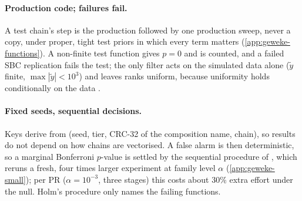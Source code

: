 \paragraph{Production code; failures fail.} A test chain's step is the production
 followed by one production sweep, never a copy, %
under proper, tight test priors in which every term matters (\cref{app:geweke-functions}). %
A non-finite test function gives $p = 0$ and is counted, and a failed SBC replication fails the
test; the only filter acts on the simulated data alone ($\tilde y$ finite, $\max|\tilde y| < 10^3$)
and leaves ranks uniform, because uniformity holds conditionally on the data
\citep[Sections~3.1--3.2, Theorems~4 and~5]{modrak2025simulation}. %

\paragraph{Fixed seeds, sequential decisions.} Keys derive from (seed, tier, CRC-32 of the
composition name, chain), so results do not depend on how chains are vectorised. %
A false alarm is then deterministic, so a marginal Bonferroni $p$-value is settled by the sequential
procedure of \citet[Algorithm~3]{gandy2021unit}, which reruns a fresh, four times larger experiment
at family level $\alpha$ (\cref{app:geweke-small}); %
per PR ($\alpha = 10^{-3}$, three stages) this costs about 30\% extra effort under the null. %
Holm's procedure \citep{holm1979simple} only names the failing functions.

